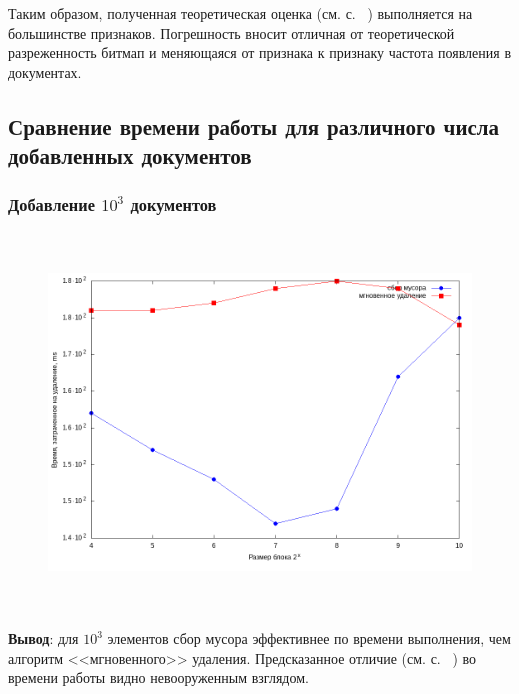 Таким образом, полученная теоретическая оценка (см. с. ~\pageref{theory})
выполняется на большинстве признаков. Погрешность вносит отличная от теоретической
разреженность битмап и меняющаяся от признака к признаку частота появления в
документах.

\newpage
\subsection{Сравнение времени работы для различного числа добавленных документов}

\subsubsection{Добавление $10^3$ документов}
\begin{figure}[H]
\includegraphics[width=\linewidth, height=10cm]{fig/time_1e3.png}
\end{figure}

\textbf{Вывод}: для $10^3$ элементов сбор мусора эффективнее по времени
выполнения, чем алгоритм <<мгновенного>> удаления. Предсказанное отличие
(см. с. ~\pageref{theory}) во времени работы видно невооруженным взглядом.

